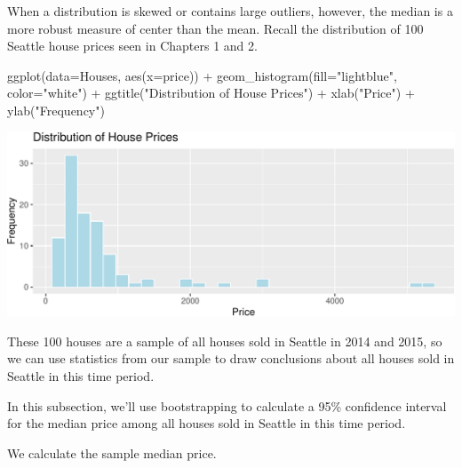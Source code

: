 \documentclass[
  letterpaper,
  DIV=11,
  numbers=noendperiod]{scrreprt}
\newenvironment{Shaded}{\begin{snugshade}}{\end{snugshade}}
\newcommand{\AttributeTok}[1]{\textcolor[rgb]{0.40,0.45,0.13}{#1}}
\newcommand{\FunctionTok}[1]{\textcolor[rgb]{0.28,0.35,0.67}{#1}}
\newcommand{\NormalTok}[1]{\textcolor[rgb]{0.00,0.23,0.31}{#1}}
\newcommand{\OtherTok}[1]{\textcolor[rgb]{0.00,0.23,0.31}{#1}}
\newcommand{\SpecialCharTok}[1]{\textcolor[rgb]{0.37,0.37,0.37}{#1}}
\newcommand{\StringTok}[1]{\textcolor[rgb]{0.13,0.47,0.30}{#1}}
\begin{document}
When a distribution is skewed or contains large outliers, however, the
median is a more robust measure of center than the mean. Recall the
distribution of 100 Seattle house prices seen in Chapters 1 and 2.

\begin{Shaded}
\begin{Highlighting}[]
\FunctionTok{ggplot}\NormalTok{(}\AttributeTok{data=}\NormalTok{Houses, }\FunctionTok{aes}\NormalTok{(}\AttributeTok{x=}\NormalTok{price)) }\SpecialCharTok{+} 
  \FunctionTok{geom\_histogram}\NormalTok{(}\AttributeTok{fill=}\StringTok{"lightblue"}\NormalTok{, }\AttributeTok{color=}\StringTok{"white"}\NormalTok{) }\SpecialCharTok{+} 
  \FunctionTok{ggtitle}\NormalTok{(}\StringTok{"Distribution of House Prices"}\NormalTok{) }\SpecialCharTok{+}
  \FunctionTok{xlab}\NormalTok{(}\StringTok{"Price"}\NormalTok{) }\SpecialCharTok{+} 
  \FunctionTok{ylab}\NormalTok{(}\StringTok{"Frequency"}\NormalTok{)}
\end{Highlighting}
\end{Shaded}

\includegraphics{Ch3_files/figure-pdf/unnamed-chunk-86-1.pdf}

These 100 houses are a sample of all houses sold in Seattle in 2014 and
2015, so we can use statistics from our sample to draw conclusions about
all houses sold in Seattle in this time period.

In this subsection, we'll use bootstrapping to calculate a 95\%
confidence interval for the median price among all houses sold in
Seattle in this time period.

We calculate the sample median price.

\begin{Shaded}
\end{Shaded}
\end{document}
